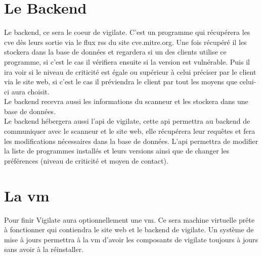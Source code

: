 \section{Le Backend}
Le backend, ce sera le coeur de vigilate. C’est un programme qui récupérera les cve dès leurs sortie via le flux rss du site cve.mitre.org. Une fois récupéré il les stockera dans la base de données et regardera si un des clients utilise ce programme, si c’est le cas il vérifiera ensuite si la version est vulnérable. Puis il ira voir si le niveau de criticité est égale ou supérieur à celui préciser par le client via le site web, si c’est le cas il préviendra le client par tout les moyens que celui-ci aura choisit.\\
Le backend recevra aussi  les informations du scanneur et les stockera dans une base de données.\\
Le backend hébergera aussi l’api de vigilate, cette api permettra au backend de communiquer avec le scanneur et le site web, elle récupérera leur requêtes et fera les modifications nécessaires dans la base de données. L’api permettra de modifier la liste de programmes installés et leurs versions ainsi que de changer les préférences (niveau de criticité et moyen de contact).\\

\section{La vm}
Pour finir Vigilate aura optionnellement une vm. Ce sera machine virtuelle prête à fonctionner qui contiendra le site web et le backend de vigilate. Un système de mise à jours permettra à la vm d’avoir les composants de vigilate toujours à jours sans avoir à la réinstaller.\\

